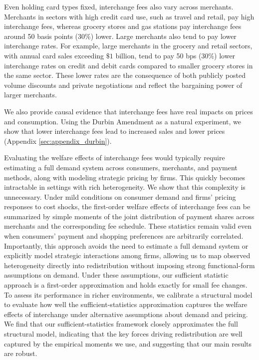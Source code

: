 \documentclass[11pt,english]{article}
\theoremstyle{remark}
\begin{document}
Even holding card types fixed, interchange fees also vary across merchants.
Merchants in sectors with high credit card use, such as travel and retail, pay high interchange fees, whereas grocery stores and gas stations pay interchange fees around 50 basis points (30\%) lower.
Large merchants also tend to pay lower interchange rates.
For example, large merchants in the grocery and retail sectors, with annual card sales exceeding $\$1$ billion, tend to pay 50 bps (30\%) lower interchange rates on credit and debit cards compared to smaller grocery stores in the same sector.
These lower rates are the consequence of both publicly posted volume discounts and private negotiations and reflect the bargaining power of larger merchants.

We also provide causal evidence that interchange fees have real impacts on prices and consumption.  Using the Durbin Amendment as a natural experiment, we show that lower interchange fees lead to increased sales and lower prices (Appendix \ref{sec:appendix_durbin}).

Evaluating the welfare effects of interchange fees would typically require estimating a full demand system across consumers, merchants, and payment methods, along with modeling strategic pricing by firms. 
This quickly becomes intractable in settings with rich heterogeneity. 
We show that this complexity is unnecessary. 
Under mild conditions on consumer demand and firms' pricing responses to cost shocks, the first-order welfare effects of interchange fees can be summarized by simple moments of the joint distribution of payment shares across merchants and the corresponding fee schedule. 
These statistics remain valid even when consumers' payment and shopping preferences are arbitrarily correlated. 
Importantly, this approach avoids the need to estimate a full demand system or explicitly model strategic interactions among firms, allowing us to map observed heterogeneity directly into redistribution without imposing strong functional-form assumptions on demand.
Under these assumptions, our sufficient statistic approach is a first-order approximation and holds exactly for small fee changes. 
To assess its performance in richer environments, we calibrate a structural model to evaluate how well the sufficient-statistics approximation captures the welfare effects of interchange under alternative assumptions about demand and pricing.
We find that our sufficient-statistics framework closely approximates the full structural model, indicating that the key forces driving redistribution are well captured by the empirical moments we use, and suggesting that our main results are robust.
\end{document}
